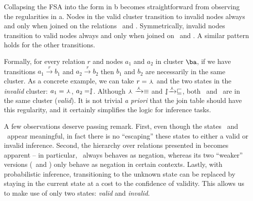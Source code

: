 Collapsing the FSA into the form in b becomes straightforward
  from observing the regularities in a.
Nodes in the valid cluster transition to invalid nodes
  always and only when joined on the relations \negate\ and \alternate.
Symmetrically, invalid nodes transition to valid nodes always and only
  when joined on \negate\ and \cover.
A similar pattern holds for the other transitions.

Formally, for every relation $r$ and nodes $a_1$ and $a_2$ in
  cluster $\ba$,
  if we have transitions 
  $a_1 \xrightarrow{r} b_1$ and $a_2 \xrightarrow{r} b_2$
  then $b_1$ and $b_2$ are necessarily in the same cluster.
As a concrete example, we can take $r = \curlywedge$ and
  the two states in the \textit{invalid} cluster:
  $a_1 = \curlywedge$, $a_2 = \downharpoonleft\hspace{-1.25mm}\upharpoonright$.
Although $\curlywedge \xrightarrow{\curlywedge} \equiv$ and
  $\downharpoonleft\hspace{-1.25mm}\upharpoonright \xrightarrow{\curlywedge} \sqsubseteq$, both
  \equivalent\ and \forward\ are in the same cluster (\textit{valid}).
It is not trivial \textit{a priori} that the join table should have
  this regularity, and it certainly simplifies the logic for
  inference tasks.

A few observations deserve passing remark.
First, even though the
  states \reverse\ and \cover\ appear meaningful, in fact there is no
  ``escaping'' these states to either a valid or invalid
  inference.
Second, the hierarchy over relations presented in
   becomes apparent -- in particular,
  \negate\ always behaves as negation, whereas its two ``weaker''
  versions (\alternate\ and \cover) only behave as negation in certain
  contexts.
Lastly, with probabilistic inference,
  transitioning to the unknown state can be replaced by staying in the
  current state at a cost to the confidence of validity.
This allows us to make use of only two states:
  \textit{valid} and \textit{invalid}.

